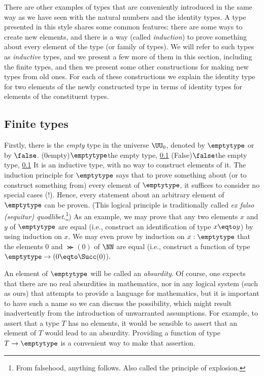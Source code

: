 There are other examples of types that are conveniently introduced
in the same way as we have seen with the natural numbers and the identity types.
A type
presented in this style shares some common features: there are some ways to create new elements, and there is a way (called \emph{induction}) to
prove something about every element of the type (or family of types).  We will refer to such types as \emph{inductive} types, and we present a
few more of them in this section, including the finite types, and then we present some other constructions for making new types from old ones.
For each of these constructions we explain the identity type for two
elements of the newly constructed type in terms of identity types for
elements of the constituent types.

\subsection{Finite types}
\label{sec:finite-types}
Firstly, there is the \emph{empty} type in the universe $\UU_0$, denoted by $\emptytype$ or by $\false$.%
  \glossary(0empty){$\protect\emptytype$}{the empty type,
      \cref{sec:finite-types}}%
  \glossary(False){$\protect\false$}{the empty type,
      \cref{sec:finite-types}}
It is an inductive type, with no way
to construct elements of it.  The induction principle for $\emptytype$ says that to prove something about (or to construct something from) every
element of $\emptytype$, it suffices to consider no special cases (!).
Hence, every statement about an arbitrary element of $\emptytype$ can be
proven. (This logical principle is traditionally called
\emph{ex falso (sequitur) quodlibet}.\footnote{%
From falsehood, anything follows. Also called the principle of explosion.})
As an example, we may prove that any two elements $x$ and $y$ of
$\emptytype$ are equal (i.e., construct an identification of
type $x\eqto y$) by using induction on $x$. We may even
prove by induction on $x:\emptytype$ that the elements
$0$ and $\Succ(0)$ of $\NN$ are equal
(i.e., construct a function of type $\emptytype\to(0\eqto\Succ(0)$).

An element of $\emptytype$ will be called an \emph{absurdity}.  Of course, one expects that there are no real absurdities in mathematics, nor in any
logical system (such as ours) that attempts to provide a language for mathematics, but it is important to have such a name so we can discuss
the possibility, which might result inadvertently from the introduction of unwarranted assumptions.  For example, to assert that a type $T$ has
no elements, it would be sensible to assert that an element of $T$ would lead to an absurdity.  Providing a function of type $T \to \emptytype$ is a
convenient way to make that assertion.

